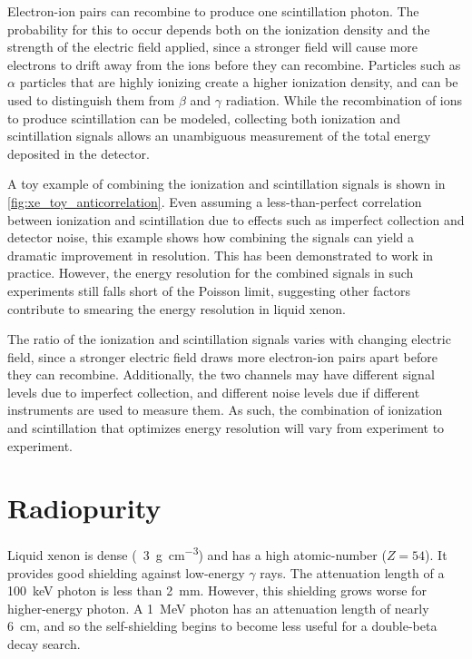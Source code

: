 \documentclass[herrin-thesis.tex]{subfiles}
\begin{document}
Electron-ion pairs can recombine to produce one scintillation photon. The probability for this to occur depends both on the ionization density and the strength of the electric field applied, since a stronger field will cause more electrons to drift away from the ions before they can recombine. Particles such as \(\alpha\) particles that are highly ionizing create a higher ionization density, and can be used to distinguish them from \(\beta\) and \(\gamma\) radiation. While the recombination of ions to produce scintillation can be modeled\cite{Doke:1988qf}\cite{Thomas:1987ve}, collecting both ionization and scintillation signals allows an unambiguous measurement of the total energy deposited in the detector.

A toy example of combining the ionization and scintillation signals is shown in \cref{fig:xe_toy_anticorrelation}. Even assuming a less-than-perfect correlation between ionization and scintillation due to effects such as imperfect collection and detector noise, this example shows how combining the signals can yield a dramatic improvement in resolution. This has been demonstrated to work in practice\cite{Conti:2003tg}\cite{Aprile:2007hc}. However, the energy resolution for the combined signals in such experiments still falls short of the Poisson limit, suggesting other factors contribute to smearing the energy resolution in liquid xenon.

The ratio of the ionization and scintillation signals varies with changing electric field, since a stronger electric field draws more electron-ion pairs apart before they can recombine. Additionally, the two channels may have different signal levels due to imperfect collection, and different noise levels due if different instruments are used to measure them. As such, the combination of ionization and scintillation that optimizes energy resolution will vary from experiment to experiment. 

\section{Radiopurity}
Liquid xenon is dense (\about~\SI{3}{\g\per\cubic\cm}) and has a high atomic-number (\(Z=54\)). It provides good shielding against low-energy \(\gamma\) rays. The attenuation length of a \SI{100}{keV} photon is less than \SI{2}{\mm}\cite{Berger:2010dq}. However, this shielding grows worse for higher-energy photon. A \SI{1}{MeV} photon has an attenuation length of nearly \SI{6}{\cm}, and so the self-shielding begins to become less useful for a double-beta decay search.
\end{document}
